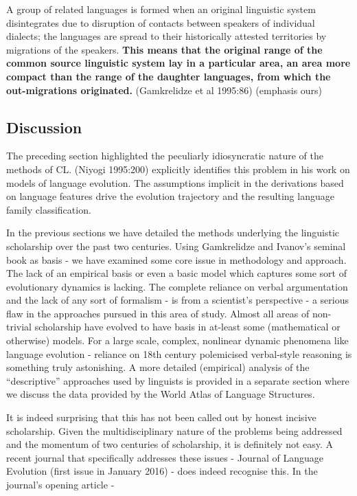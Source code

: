 \begin{myquote}
A group of related languages is formed when an original linguistic system disintegrates due to disruption of contacts between speakers of individual dialects; the languages are spread to their historically attested territories by migrations of the speakers. \textbf{This means that the original range of the common source linguistic system lay in a particular area, an area more compact than the range of the daughter languages, from which the out-migrations originated.} (Gamkrelidze et al 1995:86) (emphasis ours)
\end{myquote}


\subsection*{Discussion}

The preceding section highlighted the peculiarly idiosyncratic nature of the methods of CL. (Niyogi 1995:200) explicitly identifies this problem in his work on models of language evolution. The assumptions implicit in the derivations based on language features drive the evolution trajectory and the resulting language family classification.

In the previous sections we have detailed the methods underlying the linguistic scholarship over the past two centuries. Using Gamkrelidze and Ivanov’s seminal book as basis - we have examined some core issue in methodology and approach. The lack of an empirical basis or even a basic model which captures some sort of evolutionary dynamics is lacking. The complete reliance on verbal argumentation and the lack of any sort of formalism - is from a scientist's perspective - a serious flaw in the approaches pursued in this area of study. Almost all areas of non-trivial scholarship have evolved to have basis in at-least some (mathematical or otherwise) models. For a large scale, complex, nonlinear dynamic phenomena like language evolution - reliance on 18th century polemicised verbal-style reasoning is something truly astonishing. A more detailed (empirical) analysis of the “descriptive” approaches used by linguists is provided in a separate section where we discuss the data provided by the World Atlas of Language Structures.

It is indeed surprising that this has not been called out by honest incisive scholarship. Given the multidisciplinary nature of the problems being addressed and the momentum of two centuries of scholarship, it is definitely not easy. A recent journal that specifically addresses these issues - Journal of Language Evolution (first issue in January 2016) - does indeed recognise this. In the journal’s opening article -

